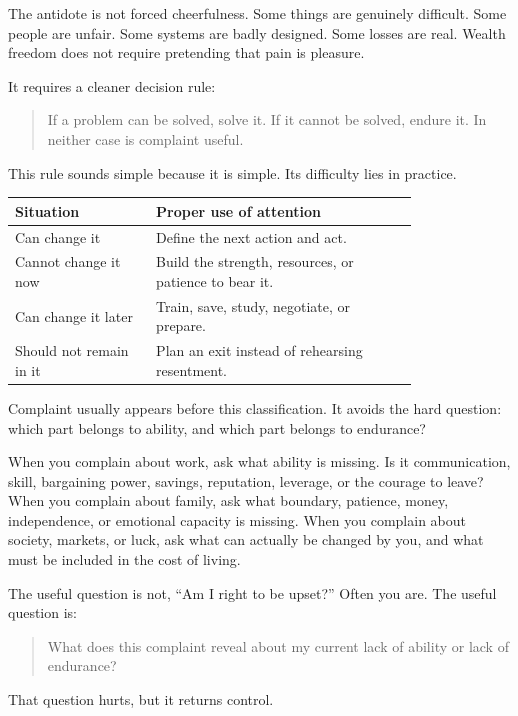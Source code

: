 The antidote is not forced cheerfulness. Some things are genuinely difficult. Some people are unfair. Some systems are badly designed. Some losses are real. Wealth freedom does not require pretending that pain is pleasure.

It requires a cleaner decision rule:

\begin{quote}
If a problem can be solved, solve it. If it cannot be solved, endure it. In neither case is complaint useful.
\end{quote}

This rule sounds simple because it is simple. Its difficulty lies in practice.

\begin{center}
\begin{tabular}{p{0.28\linewidth}p{0.52\linewidth}}
\hline
Situation & Proper use of attention \\
\hline
Can change it & Define the next action and act. \\
Cannot change it now & Build the strength, resources, or patience to bear it. \\
Can change it later & Train, save, study, negotiate, or prepare. \\
Should not remain in it & Plan an exit instead of rehearsing resentment. \\
\hline
\end{tabular}
\end{center}

Complaint usually appears before this classification. It avoids the hard question: which part belongs to ability, and which part belongs to endurance?

When you complain about work, ask what ability is missing. Is it communication, skill, bargaining power, savings, reputation, leverage, or the courage to leave? When you complain about family, ask what boundary, patience, money, independence, or emotional capacity is missing. When you complain about society, markets, or luck, ask what can actually be changed by you, and what must be included in the cost of living.

The useful question is not, ``Am I right to be upset?'' Often you are. The useful question is:

\begin{quote}
What does this complaint reveal about my current lack of ability or lack of endurance?
\end{quote}

That question hurts, but it returns control.

